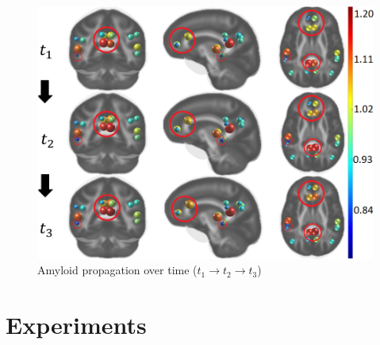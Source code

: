 \documentclass{article}
\begin{document}
\begin{figure}[!b]
\centering
\includegraphics[width=0.7\columnwidth]{brain_fig_circled_longbar.png}
    \caption{Amyloid propagation over time ($t_1 \rightarrow t_2 \rightarrow t_3$)}%
    \label{fig:abstract}
\end{figure}
\section{Experiments}
\label{sec:exp}
\end{document}
